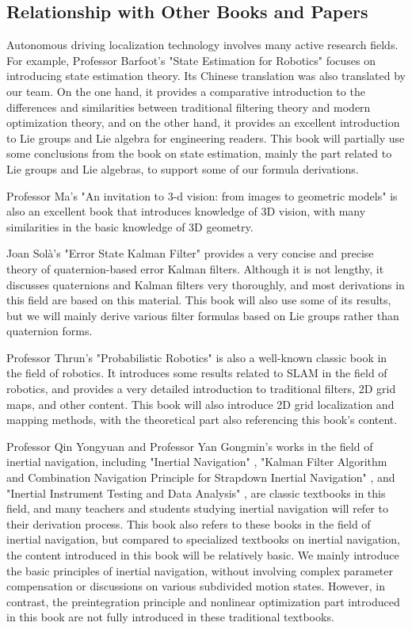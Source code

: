 \subsection*{Relationship with Other Books and Papers}
Autonomous driving localization technology involves many active research fields. For example, Professor Barfoot's "State Estimation for Robotics" \cite{Barfoot2016} focuses on introducing state estimation theory. Its Chinese translation was also translated by our team. On the one hand, it provides a comparative introduction to the differences and similarities between traditional filtering theory and modern optimization theory, and on the other hand, it provides an excellent introduction to Lie groups and Lie algebra for engineering readers. This book will partially use some conclusions from the book on state estimation, mainly the part related to Lie groups and Lie algebras, to support some of our formula derivations.

Professor Ma's "An invitation to 3-d vision: from images to geometric models" \cite{Ma2012a} is also an excellent book that introduces knowledge of 3D vision, with many similarities in the basic knowledge of 3D geometry.

Joan Sol{\`{a}}'s "Error State Kalman Filter" \cite{Sola2017} provides a very concise and precise theory of quaternion-based error Kalman filters. Although it is not lengthy, it discusses quaternions and Kalman filters very thoroughly, and most derivations in this field are based on this material. This book will also use some of its results, but we will mainly derive various filter formulas based on Lie groups rather than quaternion forms.

Professor Thrun's "Probabilistic Robotics" \cite{Thrun2005} is also a well-known classic book in the field of robotics. It introduces some results related to SLAM in the field of robotics, and provides a very detailed introduction to traditional filters, 2D grid maps, and other content. This book will also introduce 2D grid localization and mapping methods, with the theoretical part also referencing this book's content.

Professor Qin Yongyuan and Professor Yan Gongmin's works in the field of inertial navigation, including "Inertial Navigation" \cite{Qin2014}, "Kalman Filter Algorithm and Combination Navigation Principle for Strapdown Inertial Navigation" \cite{Yan2019}, and "Inertial Instrument Testing and Data Analysis" \cite{Yan2012}, are classic textbooks in this field, and many teachers and students studying inertial navigation will refer to their derivation process. This book also refers to these books in the field of inertial navigation, but compared to specialized textbooks on inertial navigation, the content introduced in this book will be relatively basic. We mainly introduce the basic principles of inertial navigation, without involving complex parameter compensation or discussions on various subdivided motion states. However, in contrast, the preintegration principle and nonlinear optimization part introduced in this book are not fully introduced in these traditional textbooks.


